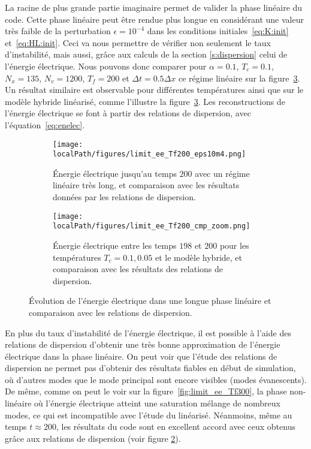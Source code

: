 La racine de plus grande partie imaginaire permet de valider la phase linéaire du code. Cette phase linéaire peut être rendue plus longue en considérant une valeur très faible de la perturbation $\epsilon=10^{-4}$ dans les conditions initiales~\eqref{eq:K:init} et~\eqref{eq:HL:init}. Ceci va nous permettre de vérifier non seulement le taux d'instabilité, mais aussi, grâce aux calculs de la section \ref{s:dispersion} celui de l'énergie électrique. Nous pouvons donc comparer pour $\alpha = 0.1$, $T_c=0.1$, $N_x=135$, $N_v=1200$, $T_f=200$ et $\Delta t = 0.5\Delta x$ ce régime linéaire sur la figure~\ref{fig:limit:ee:Tf200}. Un résultat similaire est observable pour différentes températures ainsi que sur le modèle hybride linéarisé, comme l'illustre la figure~\ref{fig:limit:ee:Tf200}. Les reconstructions de l'énergie électrique se font à partir des relations de dispersion, avec l'équation~\eqref{eq:enelec}.
\begin{figure}
  \centering
  \begin{subfigure}{0.8\textwidth}
    \centering
    \texttt{[image: \\localPath/figures/limit\_ee\_Tf200\_eps10m4.png]}
    \caption{Énergie électrique jusqu'au temps $200$ avec un régime linéaire très long, et comparaison avec les résultats données par les relations de dispersion.}
    \label{fig:limit:ee:Tf200:eps10m4}
  \end{subfigure}
  \begin{subfigure}{0.8\textwidth}
    \centering
    \texttt{[image: \\localPath/figures/limit\_ee\_Tf200\_cmp\_zoom.png]}
    \caption{Énergie électrique entre les temps $198$ et $200$ pour les températures $T_c = 0.1,0.05$ et le modèle hybride, et comparaison avec les résultats des relations de dispersion.}
    \label{fig:limit:ee:Tf200:cmp_zoom}
  \end{subfigure}
  \caption{Évolution de l'énergie électrique dans une longue phase linéaire et comparaison avec les relations de dispersion.}
  \label{fig:limit:ee:Tf200}
\end{figure}
En plus du taux d'instabilité de l'énergie électrique, il est possible à l'aide des relations de dispersion d'obtenir une très bonne approximation de l'énergie électrique dans la phase linéaire. On peut voir que l'étude des relations de dispersion ne permet pas d'obtenir des résultats fiables en début de simulation, où d'autres modes que le mode principal sont encore visibles (modes évanescents). De même, comme on peut le voir sur la figure~\ref{fig:limit_ee_Tf300}, la phase non-linéaire où l'énergie électrique atteint une saturation mélange de nombreux modes, ce qui est incompatible avec l'étude du linéarisé. Néanmoins, même au temps $t\approx 200$, les résultats du code sont en excellent accord avec ceux obtenus grâce aux relations de dispersion  (voir figure \ref{fig:limit:ee:Tf200:cmp_zoom}). 

